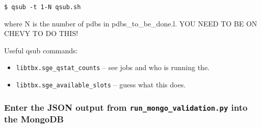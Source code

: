 \documentclass[12pt]{article}
\begin{document}
\vspace{2mm}
\noindent
\texttt{\$ qsub -t 1-N qsub.sh}

\vspace{2mm}
\noindent
where N is the number of pdbs in pdbs\_to\_be\_done.l. YOU NEED TO BE ON CHEVY TO DO THIS!

\vspace{10mm}
\noindent
Useful qsub commands:
\begin{itemize}
  \item \texttt{libtbx.sge\_qstat\_counts} -- see jobs and who is running the.
  \item \texttt{libtbx.sge\_available\_slots} -- guess what this does.
\end{itemize}
\subsubsection*{Enter the JSON output from \texttt{run\_mongo\_validation.py} into the MongoDB}
\end{document}
